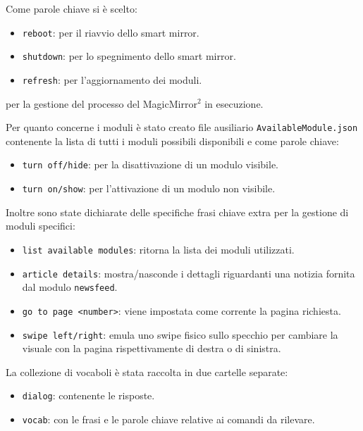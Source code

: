 \documentclass[12pt,a4paper]{article}
\begin{document}
Come parole chiave si \`e scelto:
\begin{itemize}
  \item \verb|reboot|: per il riavvio dello smart mirror.
  \item \verb|shutdown|: per lo spegnimento dello smart mirror.
  \item \verb|refresh|: per l'aggiornamento dei moduli.
\end{itemize}
per la gestione del processo del MagicMirror$^2$ in esecuzione.

Per quanto concerne i moduli \`e stato creato file ausiliario \verb|AvailableModule.json| contenente la lista
di tutti i moduli possibili disponibili e come parole chiave:
\begin{itemize}
  \item \verb|turn off/hide|: per la disattivazione di un modulo visibile.
  \item \verb|turn on/show|: per l'attivazione di un modulo non visibile.
\end{itemize}

Inoltre sono state dichiarate delle specifiche frasi chiave extra per la gestione di moduli specifici:
\begin{itemize}
  \item \verb|list available modules|: ritorna la lista dei moduli utilizzati.
  \item \verb|article details|: mostra/nasconde i dettagli riguardanti una notizia fornita dal modulo \verb|newsfeed|.
  \item \verb|go to page <number>|: viene impostata come corrente la pagina richiesta.
  \item \verb|swipe left/right|: emula uno swipe fisico sullo specchio per cambiare la visuale con la pagina rispettivamente
      di destra o di sinistra.
\end{itemize}

La collezione di vocaboli \`e stata raccolta in due cartelle separate:
\begin{itemize}
  \item \verb|dialog|: contenente le risposte.
  \item \verb|vocab|: con le frasi e le parole chiave relative ai comandi da rilevare.
\end{itemize}
\end{document}
